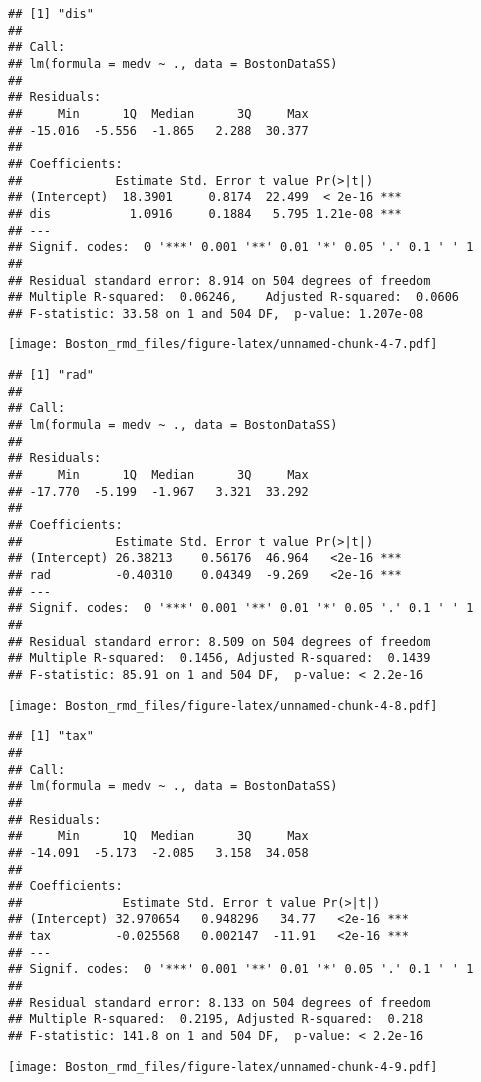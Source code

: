 \documentclass[]{article}
\begin{document}
\begin{verbatim}
## [1] "dis"
## 
## Call:
## lm(formula = medv ~ ., data = BostonDataSS)
## 
## Residuals:
##     Min      1Q  Median      3Q     Max 
## -15.016  -5.556  -1.865   2.288  30.377 
## 
## Coefficients:
##             Estimate Std. Error t value Pr(>|t|)    
## (Intercept)  18.3901     0.8174  22.499  < 2e-16 ***
## dis           1.0916     0.1884   5.795 1.21e-08 ***
## ---
## Signif. codes:  0 '***' 0.001 '**' 0.01 '*' 0.05 '.' 0.1 ' ' 1
## 
## Residual standard error: 8.914 on 504 degrees of freedom
## Multiple R-squared:  0.06246,    Adjusted R-squared:  0.0606 
## F-statistic: 33.58 on 1 and 504 DF,  p-value: 1.207e-08
\end{verbatim}

\texttt{[image: Boston\_rmd\_files/figure-latex/unnamed-chunk-4-7.pdf]}

\begin{verbatim}
## [1] "rad"
## 
## Call:
## lm(formula = medv ~ ., data = BostonDataSS)
## 
## Residuals:
##     Min      1Q  Median      3Q     Max 
## -17.770  -5.199  -1.967   3.321  33.292 
## 
## Coefficients:
##             Estimate Std. Error t value Pr(>|t|)    
## (Intercept) 26.38213    0.56176  46.964   <2e-16 ***
## rad         -0.40310    0.04349  -9.269   <2e-16 ***
## ---
## Signif. codes:  0 '***' 0.001 '**' 0.01 '*' 0.05 '.' 0.1 ' ' 1
## 
## Residual standard error: 8.509 on 504 degrees of freedom
## Multiple R-squared:  0.1456, Adjusted R-squared:  0.1439 
## F-statistic: 85.91 on 1 and 504 DF,  p-value: < 2.2e-16
\end{verbatim}

\texttt{[image: Boston\_rmd\_files/figure-latex/unnamed-chunk-4-8.pdf]}

\begin{verbatim}
## [1] "tax"
## 
## Call:
## lm(formula = medv ~ ., data = BostonDataSS)
## 
## Residuals:
##     Min      1Q  Median      3Q     Max 
## -14.091  -5.173  -2.085   3.158  34.058 
## 
## Coefficients:
##              Estimate Std. Error t value Pr(>|t|)    
## (Intercept) 32.970654   0.948296   34.77   <2e-16 ***
## tax         -0.025568   0.002147  -11.91   <2e-16 ***
## ---
## Signif. codes:  0 '***' 0.001 '**' 0.01 '*' 0.05 '.' 0.1 ' ' 1
## 
## Residual standard error: 8.133 on 504 degrees of freedom
## Multiple R-squared:  0.2195, Adjusted R-squared:  0.218 
## F-statistic: 141.8 on 1 and 504 DF,  p-value: < 2.2e-16
\end{verbatim}

\texttt{[image: Boston\_rmd\_files/figure-latex/unnamed-chunk-4-9.pdf]}
\end{document}

